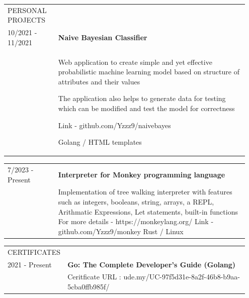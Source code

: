 \documentclass{letter}
\begin{document}
\vspace{15pt}
\begin{tabular}{p{0.2\linewidth} p{0.75\linewidth}}
  \normalsize\colorbox{black!100}{\textcolor{white!90}{PERSONAL PROJECTS}} \\[1ex] 
  10/2021 - 11/2021 & \normalsize\textbf{Naive Bayesian Classifier} \\
  & \raggedright{Web application to create simple and yet effective probabilistic machine learning model based on structure of attributes and their values} 
  \newline
  \raggedright{The application also helps to generate data for testing which can be modified and test the model for correctness} 
  \newline
  \raggedright{Link - \ttfamily github.com/Yzzz9/naivebayes} 
  \newline
  \raggedright{\ttfamily Golang / HTML templates} \\
\end{tabular}

\begin{tabular}{p{0.2\linewidth} p{0.75\linewidth}}
  7/2023 - Present & \normalsize\textbf{Interpreter for Monkey programming language} \\
  & \raggedright {Implementation of tree walking interpreter with features such as integers, booleans, string, arrays, 
  a REPL, Arithmatic Expressions, Let statements, built-in functions} 
  \newline
  For more details - https://monkeylang.org/ 
  \newline
  Link - \ttfamily github.com/Yzzz9/monkey 
  \newline
  \ttfamily Rust / Linux \\
\end{tabular}

\vspace{15pt}
\begin{tabular}{p{0.2\linewidth} p{0.75\linewidth}}
  \normalsize\colorbox{black!100}{\textcolor{white!90}{CERTIFICATES}} \\[1ex] 
  2021 - Present & \normalsize\textbf{Go: The Complete Developer's Guide (Golang)} \\
  & Ceritficate URL : \ttfamily ude.my/UC-97f5d31e-8a2f-46b8-b9aa-5cba0ffb985f/ \\
\end{tabular}
\end{document}
